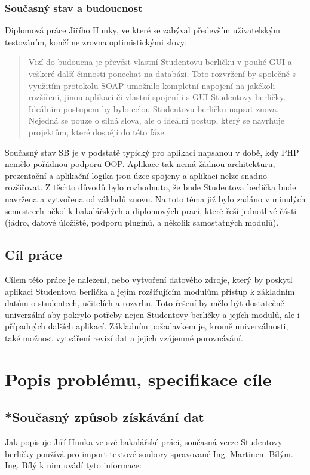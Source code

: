 \documentclass[11pt,twoside,a4paper]{book}
\begin{document}
\subsection{Současný stav a budoucnost}

Diplomová práce Jiřího Hunky, ve které se zabýval především uživatelským testováním, končí ne zrovna optimistickými slovy: 
\begin{quotation}
Vizí do budoucna je převést vlastní Studentovu berličku v pouhé GUI a
veškeré další činnosti ponechat na databázi. Toto rozvržení by společně
s využitím protokolu SOAP umožnilo kompletní napojení na jakékoli rozšíření, jinou aplikaci či vlastní spojení i s GUI Studentovy berličky.
Ideálním postupem by bylo celou Studentovu berličku napsat znova. Nejedná se pouze o silná slova, ale o ideální postup, který se navrhuje projektům, které dospějí do této fáze.
\end{quotation}

Současný stav SB je v podstatě typický pro aplikaci napsanou v době, kdy PHP nemělo pořádnou podporu OOP. Aplikace tak nemá žádnou architekturu, prezentační a aplikační logika jsou úzce spojeny a aplikaci nelze snadno rozšiřovat. Z těchto důvodů bylo rozhodnuto, že bude Studentova berlička bude navržena a vytvořena od základů znovu. Na toto téma již bylo zadáno v minulých semestrech několik bakalářských a diplomových prací, které řeší jednotlivé části (jádro, datové úložiště, podporu pluginů, a několik samostatných modulů).

\section{Cíl práce}
Cílem této práce je nalezení, nebo vytvoření datového zdroje, který by poskytl aplikaci Studentova berlička a jejím rozšiřujícím modulům přístup k základním datům o studentech, učitelích a rozvrhu. Toto řešení by mělo být dostatečně univerzální aby pokrylo potřeby nejen Studentovy berličky a jejích modulů, ale i případných dalších aplikací. Základním požadavkem je, kromě univerzálnosti, také možnost vytváření revizí dat a jejich vzájemné porovnávání.

\chapter{Popis problému, specifikace cíle}

\section{*Současný způsob získávání dat}
Jak popisuje Jiří Hunka ve své bakalářské práci\cite{hunka:bp}, současná verze Studentovy berličky používá pro import textové soubory spravované Ing. Martinem Bílým. Ing. Bílý k nim uvádí tyto informace:
\end{document}
